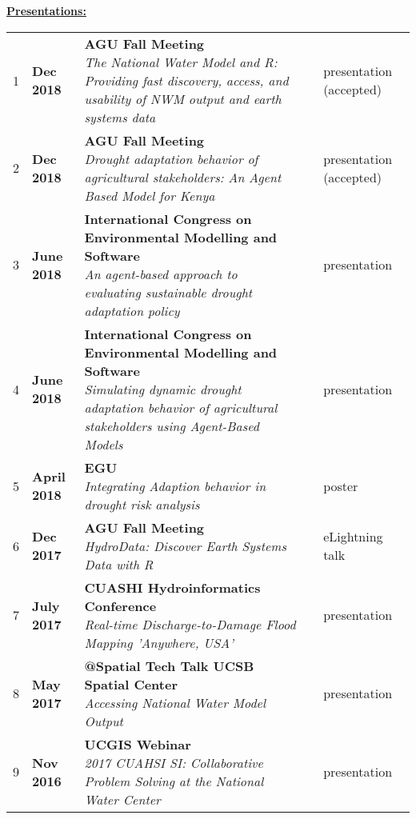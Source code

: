 \documentclass{article}
\newcommand{\header}[1]{\hspace{-5mm}\textcolor{header_blue}{\underline{\textbf{#1}}\\}} %
\begin{document}
\header{Presentations:}
\vspace{-4mm}
\begin{longtable}{lp{2.5cm}P{8.5cm}p{1cm}l}
  1 & \textbf{Dec 2018 } & {\textbf{AGU Fall Meeting} \newline \textit{The National Water Model and R: Providing fast discovery, access, and usability of NWM output and earth systems data } } &  & presentation (accepted) \\ 
  2 & \textbf{Dec 2018 } & {\textbf{AGU Fall Meeting} \newline \textit{Drought adaptation behavior of agricultural stakeholders: An Agent Based Model for Kenya } } &  & presentation (accepted) \\ 
  3 & \textbf{June 2018 } & {\textbf{International Congress on Environmental Modelling and Software} \newline \textit{An agent-based approach to evaluating sustainable drought adaptation policy } } &  & presentation \\ 
  4 & \textbf{June 2018 } & {\textbf{International Congress on Environmental Modelling and Software} \newline \textit{Simulating dynamic drought adaptation behavior of agricultural stakeholders using Agent-Based Models } } &  & presentation \\ 
  5 & \textbf{April 2018 } & {\textbf{EGU} \newline \textit{Integrating Adaption behavior in drought risk analysis } } &  & poster \\ 
  6 & \textbf{Dec 2017 } & {\textbf{AGU Fall Meeting} \newline \textit{HydroData: Discover Earth Systems Data with R } } &  & eLightning talk \\ 
  7 & \textbf{July 2017 } & {\textbf{CUASHI Hydroinformatics Conference} \newline \textit{Real-time Discharge-to-Damage Flood Mapping 'Anywhere, USA' } } &  & presentation \\ 
  8 & \textbf{May 2017 } & {\textbf{@Spatial Tech Talk UCSB Spatial Center} \newline \textit{Accessing National Water Model Output } } &  & presentation \\ 
  9 & \textbf{Nov 2016 } & {\textbf{UCGIS Webinar} \newline \textit{2017 CUAHSI SI: Collaborative Problem Solving at the National Water Center } } &  & presentation \\ 

\end{longtable}
\end{document}
